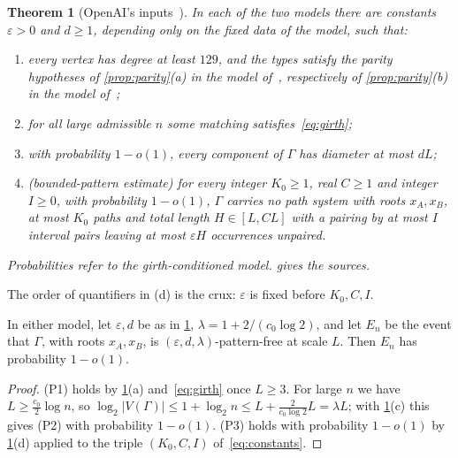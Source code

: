 \documentclass[11pt]{article}
\newtheorem{thm}{Theorem}[section]
\theoremstyle{definition}
\theoremstyle{plain}
\newcommand{\eps}{\varepsilon}
\begin{document}
\begin{thm}[OpenAI's inputs~{\cite{OAI196,OAI197a}}]\label{thm:inputs}
In each of the two models there are constants $\eps>0$ and $d\ge1$, depending only on the fixed data of the model, such that:
\begin{enumerate}[label=\textup{(\alph*)},itemsep=0pt]
\item every vertex has degree at least $129$, and the types satisfy the parity hypotheses of \cref{prop:parity}(a) in the model of~\cite{OAI196}, respectively of \cref{prop:parity}(b) in the model of~\cite{OAI197a};
\item for all large admissible $n$ some matching satisfies~\eqref{eq:girth};
\item with probability $1-o(1)$, every component of $\Gamma$ has diameter at most $dL$;
\item \textup{(bounded-pattern estimate)} for every integer $K_0\ge1$, real $C\ge1$ and integer $I\ge0$, with probability $1-o(1)$, $\Gamma$ carries no path system with roots $x_A,x_B$, at most $K_0$ paths and total length $H\in[L,CL]$ with a pairing by at most $I$ interval pairs leaving at most $\eps H$ occurrences unpaired.
\end{enumerate}
Probabilities refer to the girth-conditioned model.  gives the sources.
\end{thm}

The order of quantifiers in (d) is the crux: $\eps$ is fixed before $K_0,C,I$.

\begin{lemma}\label{lem:event}
In either model, let $\eps,d$ be as in \cref{thm:inputs}, $\lambda=1+2/(c_0\log 2)$, and let $E_n$ be the event that $\Gamma$, with roots $x_A,x_B$, is $(\eps,d,\lambda)$-pattern-free at scale $L$. Then $E_n$ has probability $1-o(1)$.
\end{lemma}

\begin{proof}
(P1) holds by \cref{thm:inputs}(a) and~\eqref{eq:girth} once $L\ge3$. For large $n$ we have $L\ge\frac{c_0}{2}\log n$, so $\log_2|V(\Gamma)|\le1+\log_2n\le L+\frac{2}{c_0\log2}L=\lambda L$; with \cref{thm:inputs}(c) this gives (P2) with probability $1-o(1)$. (P3) holds with probability $1-o(1)$ by \cref{thm:inputs}(d) applied to the triple $(K_0,C,I)$ of~\eqref{eq:constants}.
\end{proof}
\end{document}

